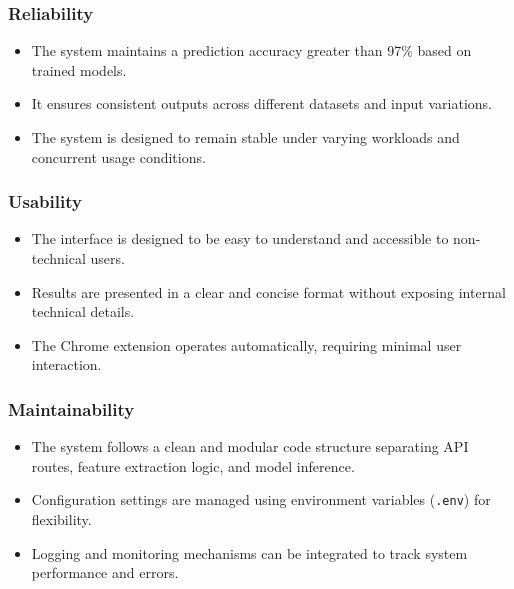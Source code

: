 \subsubsection*{Reliability}

\begin{itemize}
    \item The system maintains a prediction accuracy greater than 97\% based on trained models.
    
    \item It ensures consistent outputs across different datasets and input variations.
    
    \item The system is designed to remain stable under varying workloads and concurrent usage conditions.
\end{itemize}

\subsubsection*{Usability}

\begin{itemize}
    \item The interface is designed to be easy to understand and accessible to non-technical users.
    
    \item Results are presented in a clear and concise format without exposing internal technical details.
    
    \item The Chrome extension operates automatically, requiring minimal user interaction.
\end{itemize}

\subsubsection*{Maintainability}

\begin{itemize}
    \item The system follows a clean and modular code structure separating API routes, feature extraction logic, and model inference.
    
    \item Configuration settings are managed using environment variables (\texttt{.env}) for flexibility.
    
    \item Logging and monitoring mechanisms can be integrated to track system performance and errors.
\end{itemize}

